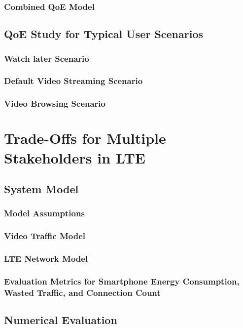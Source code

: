 \subsubsection*{Combined QoE Model}

\subsection{QoE Study for Typical User Scenarios}
\subsubsection*{Watch later Scenario}
\subsubsection*{Default Video Streaming Scenario}
\subsubsection*{Video Browsing Scenario}

\section{Trade-Offs for Multiple Stakeholders in LTE}
\subsection{System Model}
\subsubsection*{Model Assumptions}
\subsubsection*{Video Traffic Model}
\subsubsection*{LTE Network Model}
\subsubsection*{Evaluation Metrics for Smartphone Energy Consumption, Wasted Traffic, and Connection Count}

\subsection{Numerical Evaluation}
